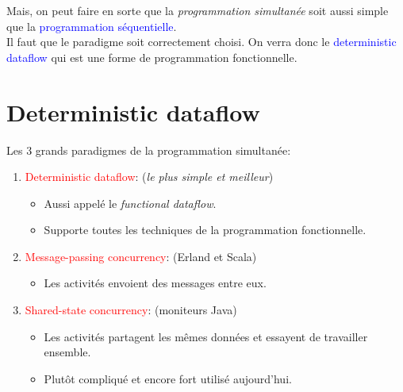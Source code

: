 \documentclass{report}
\begin{document}
Mais, on peut faire en sorte que la \textit{programmation simultanée} soit aussi simple que la \textcolor{blue}{programmation séquentielle}.\\
Il faut que le paradigme soit correctement choisi. On verra donc le \textcolor{blue}{deterministic dataflow} qui est une forme de programmation fonctionnelle.


\section{Deterministic dataflow}
Les 3 grands paradigmes de la programmation simultanée:
\begin{enumerate}
\item \textcolor{red}{Deterministic dataflow}: (\textit{le plus simple et meilleur})
	\begin{itemize}
	\item Aussi appelé le \textit{functional dataflow}.
	\item Supporte toutes les techniques de la programmation fonctionnelle.
	\end{itemize}

\item \textcolor{red}{Message-passing concurrency}: (Erland et Scala)
	\begin{itemize}
	\item Les activités envoient des messages entre eux.
	\end{itemize}

\item \textcolor{red}{Shared-state concurrency}: (moniteurs Java)
	\begin{itemize}
	\item Les activités partagent les mêmes données et essayent de travailler ensemble.
	\item Plutôt compliqué et encore fort utilisé aujourd'hui.
	\end{itemize}
\end{enumerate}
\end{document}
